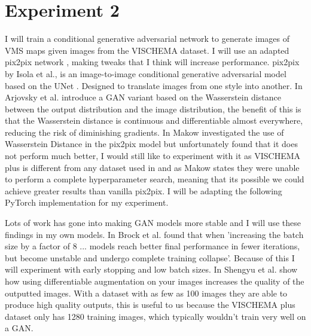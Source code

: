 \documentclass{UoYCSproject}
\begin{document}
\section{Experiment 2}

I will train a conditional generative adversarial network to generate images of VMS maps given images from the VISCHEMA dataset. I will use an adapted pix2pix network \cite{isola2018imagetoimage}, making tweaks that I think will increase performance. 
pix2pix by Isola et al.\cite{isola2018imagetoimage}, is an image-to-image conditional generative adversarial model based on the UNet \cite{ronneberger2015unet}. Designed to translate images from one style into another. In \cite{arjovsky2017wasserstein} Arjovsky et al. introduce a GAN variant based on the Wasserstein distance between the output distribution and the image distribution, the benefit of this is that the Wasserstein distance is continuous and differentiable almost everywhere, reducing the risk of diminishing gradients. In \cite{pix2pixwasserstein} Makow investigated the use of Wasserstein Distance in the pix2pix model but unfortunately found that it does not perform much better, I would still like to experiment with it as VISCHEMA plus is different from any dataset used in \cite{isola2018imagetoimage} and as Makow states they were unable to perform a complete hyperparameter search, meaning that its possible we could achieve greater results than vanilla pix2pix.
I will be adapting the following PyTorch implementation \cite{PytorchPix2Pix} for my experiment. 

Lots of work has gone into making GAN models more stable and I will use these findings in my own models. In \cite{brock2019large} Brock et al. found that when 'increasing the batch size by a factor of 8 ... models reach better final performance in fewer iterations, but become unstable and undergo complete training collapse'. Because of this I will experiment with early stopping and low batch sizes.  In \cite{zhao2020differentiable} Shengyu et al. show how using differentiable augmentation on your images increases the quality of the outputted images. With a dataset with as few as 100 images they are able to produce high quality outputs, this is useful to us because the VISCHEMA plus dataset only has 1280 training images, which typically wouldn't train very well on a GAN.
\end{document}
